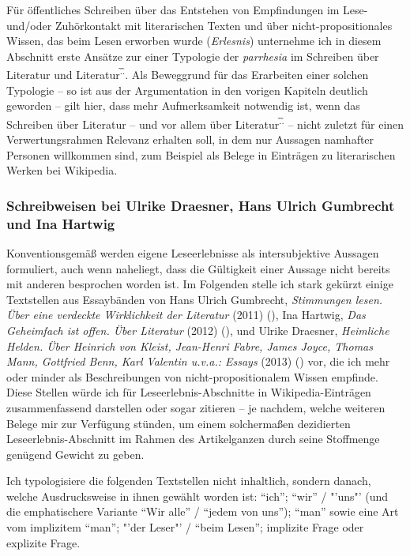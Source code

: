 \documentclass[fontsize=12pt]{scrartcl}
\begin{document}
F\"ur \"of\-fent\-liches Schrei\-ben \"uber das Entstehen von Emp\-fin\-dun\-gen im Lese- und/oder Zuh\"orkontakt mit li\-te\-ra\-rischen Texten und \"uber nicht-pro\-po\-si\-ti\-o\-na\-les Wissen, das beim Lesen erworben wurde (\textit{Erlesnis}) unternehme ich in diesem Abschnitt erste Ans\"atze zur einer Typologie der \textit{parrhesia} im Schrei\-ben \"uber Li\-te\-ra\-tur und Li\-te\-ra\-tur\textsuperscript{\~.\~.}. Als Beweggrund f\"ur das Erarbei\-ten einer solchen Typologie -- so ist aus der Argumentation in den vorigen Kapiteln deutlich geworden -- gilt \mbox{hier}, dass mehr Aufmerksamkeit notwendig ist, wenn das Schrei\-ben \"uber Li\-te\-ra\-tur -- und vor allem \"uber Li\-te\-ra\-tur\textsuperscript{\~.\~.} -- nicht zu\-letzt f\"ur einen Verwertungsrahmen Relevanz erhalten soll, in dem nur Aussagen namhafter Per\-so\-nen willkommen sind, zum Beispiel als Belege in Eintr\"agen zu li\-te\-ra\-rischen Werken bei Wi\-ki\-pe\-dia. 

\subsubsection{Schreibweisen bei Ulrike Draesner, Hans Ulrich Gumbrecht und Ina Hartwig}
\label{subsubsec:7.1.1}

Konventionsgem\"a{\ss} werden eigene Leseerlebnisse als intersubjektive Aussagen formuliert, auch wenn naheliegt, dass die G\"ultigkeit einer Aussage nicht bereits mit anderen besprochen worden ist. Im Folgenden stelle ich stark gek\"urzt einige Textstellen aus Essayb\"anden von Hans Ulrich Gumbrecht, \textit{Stimmungen lesen. \"Uber eine verdeckte Wirklichkeit der Li\-te\-ra\-tur} (2011) (\cite{Gumbrecht2011}), Ina Hartwig, \textit{Das Geheimfach ist offen. \"Uber Li\-te\-ra\-tur} (2012) (\cite{Hartwig2012}), und Ulrike Draesner, \textit{Heimliche Helden. \"Uber Heinrich von Kleist, Jean-Henri Fabre, James Joyce, Thomas Mann, Gottfried Benn, Karl Valentin u.v.a.: Essays} (2013) (\cite{Draesner2013}) vor, die ich mehr oder minder als Beschreibungen von nicht-pro\-po\-si\-ti\-o\-na\-lem Wissen empfinde. Diese Stellen w\"urde ich f\"ur Leseerlebnis-Abschnitte in Wi\-ki\-pe\-dia-Eintr\"agen zusammenfassend dar\-stel\-len oder sogar zitieren -- je nachdem, welche weiteren Belege mir zur Verf\"ugung st\"unden, um einem solcherma{\ss}en dezidierten Leseerlebnis-Abschnitt im Rahmen des Artikelganzen durch seine Stoffmenge gen\"ugend Gewicht zu geben. 

Ich typologisiere die folgenden Textstellen nicht inhaltlich, sondern danach, welche Ausdrucksweise in ihnen gew\"ahlt worden ist: "`ich"'; "`wir"' / "'uns"' (und die empha\-ti\-schere Variante "`Wir alle"' / "`jedem von uns"'); "`man"' sowie eine Art vom implizitem "`man"'; "'der Leser\textsuperscript{\tiny *}"' / "`beim Lesen"'; implizite Frage oder explizite Frage. 
\end{document}
